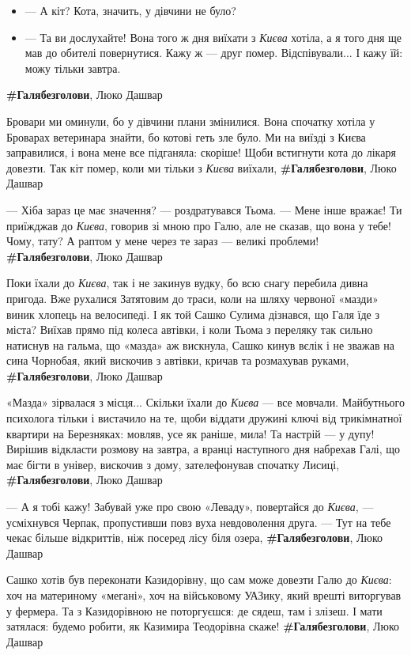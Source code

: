 \begin{itemize}
\item — А кіт? Кота, значить, у дівчини не було?
\item — Та ви дослухайте! Вона того ж дня виїхати з \emph{Києва} хотіла, а я
        того дня ще мав до обителі повернутися. Кажу ж — друг помер.
                Відспівували... І кажу їй: можу тільки завтра.
\end{itemize}
\textbf{\#Галябезголови}, Люко Дашвар

Бровари ми оминули, бо у дівчини плани змінилися. Вона спочатку хотіла у
Броварах ветеринара знайти, бо котові геть зле було. Ми на виїзді з Києва
заправилися, і вона мене все підганяла: скоріше! Щоби встигнути кота до лікаря
довезти. Так кіт помер, коли ми тільки з \emph{Києва} виїхали,
\textbf{\#Галябезголови}, Люко Дашвар

— Хіба зараз це має значення? — роздратувався Тьома. — Мене інше вражає! Ти
приїжджав до \emph{Києва}, говорив зі мною про Галю, але не сказав, що вона у тебе!
Чому, тату? А раптом у мене через те зараз — великі проблеми!
\textbf{\#Галябезголови}, Люко Дашвар

Поки їхали до \emph{Києва}, так і не закинув вудку, бо всю снагу перебила дивна
пригода. Вже рухалися Затятовим до траси, коли на шляху червоної «мазди» виник
хлопець на велосипеді. І як той Сашко Сулима дізнався, що Галя їде з міста?
Виїхав прямо під колеса автівки, і коли Тьома з переляку так сильно натиснув на
гальма, що «мазда» аж вискнула, Сашко кинув вєлік і не зважав на сина Чорнобая,
який вискочив з автівки, кричав та розмахував руками,
\textbf{\#Галябезголови}, Люко Дашвар

«Мазда» зірвалася з місця... Скільки їхали до \emph{Києва} — все мовчали.
Майбутнього психолога тільки і вистачило на те, щоби віддати дружині ключі від
трикімнатної квартири на Березняках: мовляв, усе як раніше, мила! Та настрій —
у дупу!  Вирішив відкласти розмову на завтра, а вранці наступного дня набрехав
Галі, що має бігти в універ, вискочив з дому, зателефонував спочатку Лисиці,
\textbf{\#Галябезголови}, Люко Дашвар

— А я тобі кажу! Забувай уже про свою «Леваду», повертайся до \emph{Києва}, —
усміхнувся Черпак, пропустивши повз вуха невдоволення друга. — Тут на тебе
чекає більше відкриттів, ніж посеред лісу біля озера,
\textbf{\#Галябезголови}, Люко Дашвар

Сашко хотів був переконати Казидорівну, що сам може довезти Галю до \emph{Києва}: хоч
на материному «мегані», хоч на військовому УАЗику, який врешті виторгував у
фермера. Та з Казидорівною не поторгуєшся: де сядеш, там і злізеш. І мати
затялася: будемо робити, як Казимира Теодорівна скаже!
\textbf{\#Галябезголови}, Люко Дашвар

